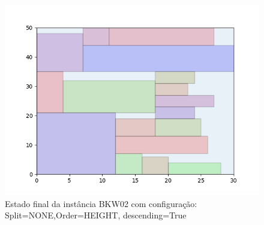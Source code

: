 \begin{figure}[H]
    \centering
    \caption[]{Estado final da instância BKW02 com configuração: Split=NONE,Order=HEIGHT, descending=True}
    \label{fig:bkw02-none-height-true}
    \includegraphics[scale=0.5]{output/figures/bkw/bkw02/none/height/true/00}
\end{figure}